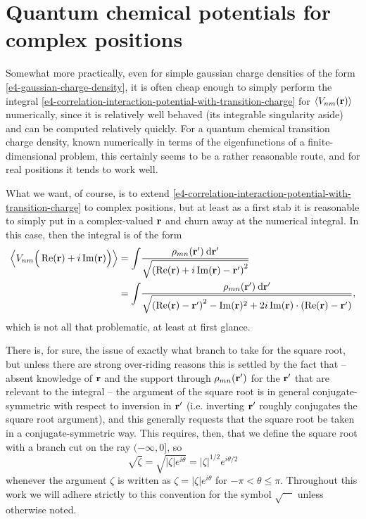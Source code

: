 \section{Quantum chemical potentials for complex positions}
\label{sec:quantum-chemical-potentials-complex}
Somewhat more practically, even for simple gaussian charge densities of the form \eqref{e4-gaussian-charge-density}, it is often cheap enough to simply perform the integral \eqref{e4-correlation-interaction-potential-with-transition-charge} for $\left\langle V_{nm}\mathopen{}\left( \vb{r} \right)\mathclose{} \right\rangle$ numerically, since it is relatively well behaved (its integrable singularity aside) and can be computed relatively quickly. For a quantum chemical transition charge density, known numerically in terms of the eigenfunctions of a finite-dimensional problem, this certainly seems to be a rather reasonable route, and for real positions it tends to work well.


What we want, of course, is to extend \eqref{e4-correlation-interaction-potential-with-transition-charge} to complex positions, but at least as a first stab it is reasonable to simply put in a complex-valued $\vb{r}$ and churn away at the numerical integral. In this case, then the integral is of the form
\begin{align}
\left\langle V_{nm}\mathopen{}\left( \vphantom{\sum} \Re(\vb{r})+i\Im(\vb{r}) \right)\mathclose{} \right\rangle
& =
\int\!
\frac{
  \rho_{mn}(\vb{r}')
  \: \mathrm{d}\vb{r}'
  }{
  \sqrt{ \left( \Re(\vb{r})+i\Im(\vb{r}) - \vb{r}' \right)^2 }
  }
\nonumber \\ & =
\int\!
\frac{
  \rho_{mn}(\vb{r}')
  \: \mathrm{d}\vb{r}'
  }{
  \sqrt{ \left( \Re(\vb{r})-\vb{r}' \right)^2 - \Im(\vb{r})^2 + 2i\Im(\vb{r})\cdot (\Re(\vb{r})-\vb{r}')}
  }
,
\label{e4-correlation-interaction-potential-with-complex-position}
\end{align}
which is not all that problematic, at least at first glance.

There is, for sure, the issue of exactly what branch to take for the square root, but unless there are strong over-riding reasons this is settled by the fact that -- absent knowledge of $\vb{r}$ and the support through $\rho_{mn}(\vb{r}')$ for the $\vb{r}'$ that are relevant to the integral -- the argument of the square root is in general conjugate-symmetric with respect to inversion in $\vb{r}'$ (i.e. inverting $\vb{r}'$ roughly conjugates the square root argument), and this generally requests that the square root be taken in a conjugate-symmetric way. This requires, then, that we define the square root with a branch cut on the ray $(-\infty,0]$, so
\begin{equation}
\sqrt{\zeta}=\sqrt{|\zeta|e^{i\theta}} = |\zeta|^{1/2} e^{i\theta/2}
\label{e4-square-root-definition}
\end{equation}
whenever the argument $\zeta$ is written as $\zeta=|\zeta|e^{i\theta}$ for $-\pi< \theta \leq \pi$. Throughout this work we will adhere strictly to this convention for the symbol $\sqrt{\phantom{zz}}$ unless otherwise noted.


